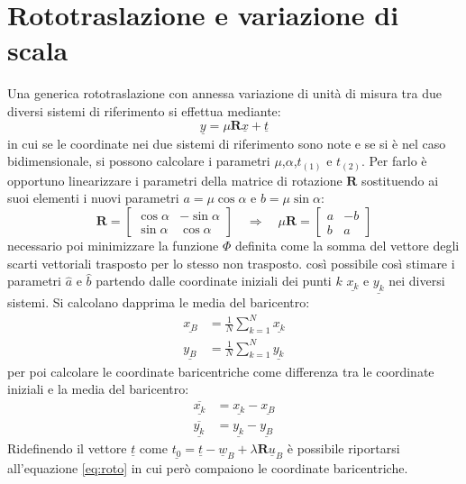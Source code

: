 \chapter{Rototraslazione e variazione di scala}\label{cap:cap3}
Una generica rototraslazione con annessa variazione di unità di misura tra due diversi sistemi di riferimento si effettua mediante:
\begin{equation}
	\label{eq:roto}
	\underline{y}=\mu \mathbf{R} \underline{x}+\underline{t}
\end{equation}
in cui se le coordinate nei due sistemi di riferimento sono note e se si è nel caso bidimensionale, si possono calcolare i parametri $\mu$,$\alpha$,$t_{(1)}$ e $t_{(2)}$.
Per farlo è opportuno linearizzare i parametri della matrice di rotazione $\mathbf{R}$ sostituendo ai suoi elementi i nuovi parametri $a=\mu\cos\alpha$ e $b=\mu\sin\alpha$:
\[
\mathbf{R}=
\begin{bmatrix}
\cos\alpha & -\sin\alpha \\ 
\sin\alpha & \cos\alpha
\end{bmatrix} 
\quad \Longrightarrow \quad
\mu \mathbf{R} = 
\begin{bmatrix}
a & -b \\ 
b & a
\end{bmatrix} 
\]
\e necessario poi minimizzare la funzione $\Phi$ definita come la somma del vettore degli scarti vettoriali trasposto per lo stesso non trasposto.
\e così possibile così stimare i parametri $\hat{a}$ e $\hat{b}$ partendo dalle coordinate iniziali dei punti $k$ $\underline{x_k}$ e $\underline{y_k}$ nei diversi sistemi.
Si calcolano dapprima le media del baricentro:
\begin{align}
\label{eq:media}
\underline{x_B} &= \frac{1}{N}\sum_{k=1}^{N}\underline{x_k}\\
\underline{y_B} &= \frac{1}{N}\sum_{k=1}^{N}\underline{y_k}
\end{align}
per poi calcolare le coordinate baricentriche come differenza tra le coordinate iniziali e la media del baricentro:
\begin{align}
\overline{\underline{x_k}} &= \underline{x_k} - \underline{x_B}\\
\label{eq:baricentriche}
\overline{\underline{y_k}} &= \underline{y_k} - \underline{y_B}
\end{align}
Ridefinendo il vettore $\underline{t}$ come $\underline{t_{0}}=\underline{t}-\underline{w}_{B}+\lambda \mathbf{R} \underline{u}_{B}$ è possibile riportarsi all'equazione \ref{eq:roto} in cui però compaiono le coordinate baricentriche.
